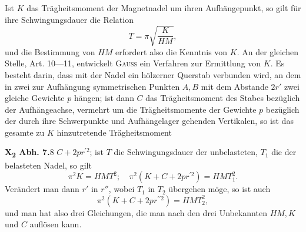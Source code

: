 \begin{center}\end{center}
\noindent\hspace*{\parindent}Ist \(K\) das Trägheitsmoment der Magnetnadel um ihren Aufhängepunkt,
so gilt für ihre Schwingungsdauer die Relation
\[
T=\pi\sqrt{\frac{K}{HM}},
\]
\noindent und die Bestimmung von \(HM\) erfordert also die Kenntnis von \(K\). An der
gleichen Stelle, Art. 10—11, entwickelt \textsc{Gauss} ein Verfahren zur Ermittlung
von \(K\). Es besteht darin, dass mit der Nadel ein hölzerner Querstab verbunden
wird, an dem in zwei zur Aufhängung symmetrischen Punkten \(A,B\)
mit dem Abstande \(2r'\) zwei gleiche Gewichte \(p\) hängen; ist dann \(C\) das Trägheitsmoment
des Stabes bezüglich der Aufhängeachse, vermehrt um die Trägheitsmomente
der Gewichte \(p\) bezüglich der durch ihre Schwerpunkte und Aufhängelager
gehenden Vertikalen, so ist das gesamte zu \(K\) hinzutretende Trägheitsmoment
\par\noindent\textbf{X\textsubscript{2} Abh. 7.}\hfill 8
\clearpage{}
\noindent\(C+2pr^{\prime2}\); ist \(T\) die Schwingungsdauer der unbelasteten, \(T_1\) die
der belasteten Nadel, so gilt
\[
\pi^2K=HMT^2;\quad\pi^2(K+C+2pr^{\prime2})=HMT_1^2.
\]
\noindent Verändert man dann \(r'\) in \(r''\), wobei \(T_1\) in \(T_2\) übergehen möge, so ist auch
\[
\pi^2(K+C+2pr^{\prime\prime2})=HMT_2^2,
\]
\noindent und man hat also drei Gleichungen, die man nach den drei Unbekannten
\(HM,K\) und \(C\) auflösen kann.

